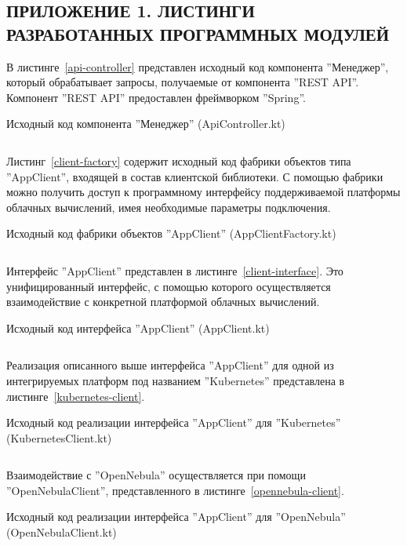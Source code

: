 \begin{center}
\section*{ПРИЛОЖЕНИЕ 1. ЛИСТИНГИ РАЗРАБОТАННЫХ ПРОГРАММНЫХ МОДУЛЕЙ}
\end{center}
В листинге~\ref{api-controller} представлен исходный код компонента ''Менеджер'', который обрабатывает запросы, получаемые от компонента ''REST API''. 
Компонент ''REST API'' предоставлен фреймворком ''Spring''.
\begin{longlisting}
    \caption{Исходный код компонента ''Менеджер'' (ApiController.kt)}
    \label{api-controller}
    \inputminted{kotlin}{code/ApiController.kt}
\end{longlisting}

Листинг~\ref{client-factory} содержит исходный код фабрики объектов типа ''AppClient'', входящей в состав клиентской библиотеки.
С помощью фабрики можно получить доступ к программному интерфейсу поддерживаемой платформы облачных вычислений, имея необходимые параметры подключения.
\begin{longlisting}
    \caption{Исходный код фабрики объектов ''AppClient'' (AppClientFactory.kt)}
    \label{client-factory}
    \inputminted{kotlin}{code/AppClientFactory.kt}
\end{longlisting}

Интерфейс ''AppClient'' представлен в листинге~\ref{client-interface}.
Это унифицированный интерфейс, с помощью которого осуществляется взаимодействие с конкретной платформой облачных вычислений.
\begin{longlisting}
    \caption{Исходный код интерфейса ''AppClient'' (AppClient.kt)}
    \label{client-interface}
    \inputminted{kotlin}{code/AppClient.kt}
\end{longlisting}


Реализация описанного выше интерфейса ''AppClient'' для одной из интегрируемых платформ под названием ''Kubernetes'' представлена в листинге~\ref{kubernetes-client}.
\begin{longlisting}
    \caption{Исходный код реализации интерфейса ''AppClient'' для ''Kubernetes'' (KubernetesClient.kt)}
    \label{kubernetes-client}
    \inputminted{kotlin}{code/KubernetesClient.kt}
\end{longlisting}

Взаимодействие с ''OpenNebula'' осуществляется при помощи ''OpenNebulaClient'', представленного в листинге~\ref{opennebula-client}.
\begin{longlisting}
    \caption{Исходный код реализации интерфейса ''AppClient'' для ''OpenNebula'' (OpenNebulaClient.kt)}
    \label{opennebula-client}
    \inputminted{kotlin}{code/OpenNebulaClient.kt}
\end{longlisting}

